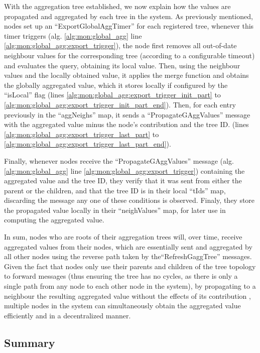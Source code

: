 With the aggregation tree established, we now explain how the values are propagated and aggregated by each tree in the system. As previously mentioned, nodes set up an ``ExportGlobalAggTimer'' for each registered tree, whenever this timer triggers (alg.  \ref{alg:mon:global_agg} line \ref{alg:mon:global_agg:export_trigger}), the node first removes all out-of-date neighbour values for the corresponding tree (according to a configurable timeout) and evaluates the query, obtaining its local value. Then, using the neighbour values and the locally obtained value, it applies the merge function and obtains the globally aggregated value, which it stores locally if configured by the ``isLocal'' flag (lines \ref{alg:mon:global_agg:export_trigger_init_part} to \ref{alg:mon:global_agg:export_trigger_init_part_end}). Then, for each entry previously in the ``aggNeighs'' map, it sends a ``PropagateGAggValues'' message with the aggregated value minus the node's contribution and the tree ID. (lines \ref{alg:mon:global_agg:export_trigger_last_part} to \ref{alg:mon:global_agg:export_trigger_last_part_end}). 

Finally, whenever nodes receive the ``PropagateGAggValues'' message (alg. \ref{alg:mon:global_agg} line \ref{alg:mon:global_agg:export_trigger}) containing the aggregated value and the tree ID, they verify that it was sent from either the parent or the children, and that the tree ID is in their local ``tIds'' map, discarding the message any one of these conditions is observed. Finaly, they store the propagated value locally in their ``neighValues'' map, for later use in computing the aggregated value.

In sum, nodes who are roots of their aggregation trees will, over time, receive aggregated values from their nodes, which are essentially sent and aggregated by all other nodes using the reverse path taken by the``RefreshGaggTree'' messages. Given the fact that nodes only use their parents and children of the tree topology to forward messages (thus ensuring the tree has no cycles, as there is only a single path from any node to each other node in the system), by propagating to a neighbour the resulting aggregated value without the effects of its contribution \cite{akosThesis}, multiple nodes in the system can simultaneously obtain the aggregated value efficiently and in a decentralized manner.

\subsection{Summary}

